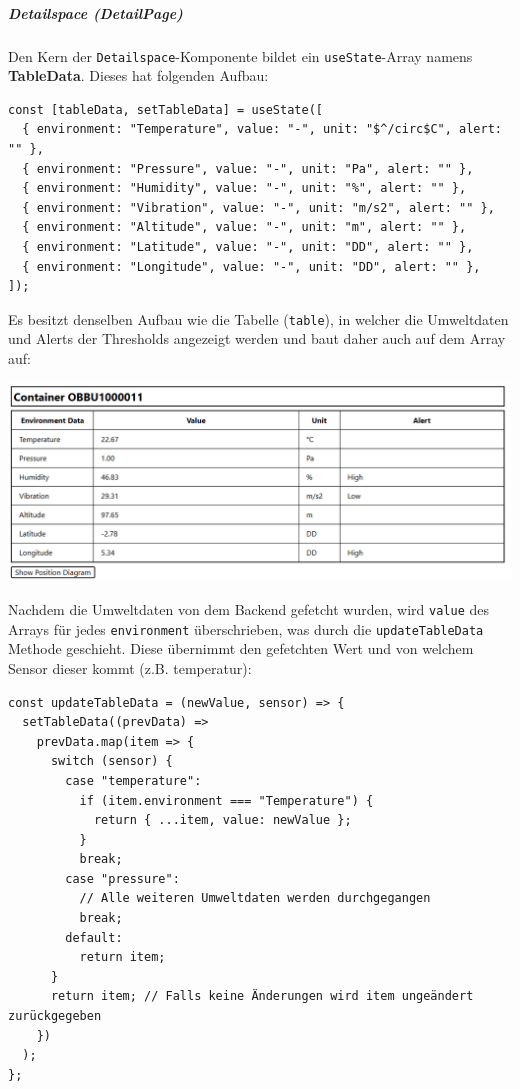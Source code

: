 \documentclass[
    headings=optiontotocandhead,%
    twoside,
    numbers=noenddot,%
    12pt, %
    titlepage, %
    parskip=full, %
    listof=leveldown, 
    numbers=noenddot, %
    a4paper,DIV=14,
    BCOR=15mm,
]{scrbook}
\newcommand{\passthrough}[1]{#1}
\let\origfigure=\figure
\let\endorigfigure=\endfigure
\renewenvironment{figure}[1][]{%
   \origfigure[H]
}{%
   \endorigfigure
}
\begin{document}
\hypertarget{detailspace-detailpage}{%
\subparagraph{Detailspace (DetailPage)}\label{detailspace-detailpage}}

Den Kern der \passthrough{\lstinline!Detailspace!}-Komponente bildet ein
\passthrough{\lstinline!useState!}-Array namens \textbf{TableData}.
Dieses hat folgenden Aufbau:

\begin{lstlisting}[caption={tableData Array useState}]
const [tableData, setTableData] = useState([
  { environment: "Temperature", value: "-", unit: "$^/circ$C", alert: "" },
  { environment: "Pressure", value: "-", unit: "Pa", alert: "" },
  { environment: "Humidity", value: "-", unit: "%", alert: "" },
  { environment: "Vibration", value: "-", unit: "m/s2", alert: "" },
  { environment: "Altitude", value: "-", unit: "m", alert: "" },
  { environment: "Latitude", value: "-", unit: "DD", alert: "" },
  { environment: "Longitude", value: "-", unit: "DD", alert: "" },
]);
\end{lstlisting}

Es besitzt denselben Aufbau wie die Tabelle
(\passthrough{\lstinline!table!}), in welcher die Umweltdaten und Alerts
der Thresholds angezeigt werden und baut daher auch auf dem Array auf:

\begin{figure}
\centering
\includegraphics{img/Gekle/DetailspaceCloseup.png}
\caption{Tabelle basierend auf dem tableData Array}
\end{figure}

Nachdem die Umweltdaten von dem Backend gefetcht wurden, wird
\passthrough{\lstinline!value!} des Arrays für jedes
\passthrough{\lstinline!environment!} überschrieben, was durch die
\passthrough{\lstinline!updateTableData!} Methode geschieht. Diese
übernimmt den gefetchten Wert und von welchem Sensor dieser kommt (z.B.
temperatur):

\begin{lstlisting}[caption={updateTableData Methode}]
const updateTableData = (newValue, sensor) => {
  setTableData((prevData) =>
    prevData.map(item => {
      switch (sensor) {
        case "temperature":
          if (item.environment === "Temperature") {
            return { ...item, value: newValue };
          }
          break;
        case "pressure":
          // Alle weiteren Umweltdaten werden durchgegangen
          break;
        default:
          return item;
      }
      return item; // Falls keine Änderungen wird item ungeändert zurückgegeben
    })
  );
};
\end{lstlisting}
\end{document}
